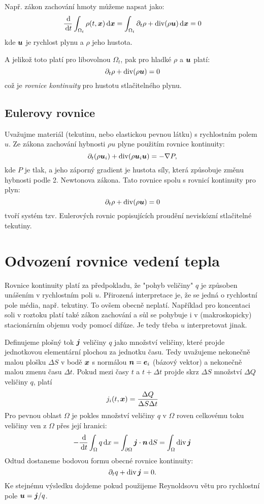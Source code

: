 Např. zákon zachování hmoty můžeme napsat jako:
\[
    \frac{\,{\rm d}}{\,{\rm d} t} \int_{\Omega_t} \rho(t,\mathbf{\boldsymbol{x}}) \,{\rm d} \mathbf{\boldsymbol{x}} = \int_{\Omega_t} \partial_t \rho + \operatorname{div} (\rho \mathbf{\boldsymbol{u}}) \,{\rm d} \mathbf{\boldsymbol{x}} = 0
\]
kde $\mathbf{\boldsymbol{u}}$ je rychlost plynu a $\rho$ jeho hustota.

A jelikož toto platí pro libovolnou $\Omega_t$, pak pro hladké $\rho$ a $\mathbf{\boldsymbol{u}}$ platí:
\[
    \partial_t \rho + \operatorname{div} (\rho \mathbf{\boldsymbol{u}}) =0
\]
což je \emph{rovnice kontinuity} pro hustotu stlačitelného plynu.

\subsection{Eulerovy rovnice}
Uvažujme materiál (tekutinu, nebo elastickou pevnou látku) s rychlostním polem  $u$. Ze zákona zachování hybnosti $\rho u$ 
plyne použitím rovnice kontinuity:
\[
    \partial_t (\rho \mathbf{\boldsymbol{u}}_i) +\operatorname{div}(\rho \mathbf{\boldsymbol{u}}_i \mathbf{\boldsymbol{u}}) = - \nabla P,
\]
kde $P$ je tlak, a jeho záporný gradient je hustota síly, která způsobuje změnu hybnosti podle 2. Newtonova zákona.
Tato rovnice spolu s rovnicí kontinuity pro plyn:
\[
    \partial_t \rho + \operatorname{div}( \rho \mathbf{\boldsymbol{u}})=0
\]
tvoří systém tzv. Eulerových rovnic popisujících proudění neviskózní stlačitelné tekutiny.


\section{Odvození rovnice vedení tepla}
Rovnice kontinuity platí za předpokladu, že "pohyb veličiny" $q$ je způsoben unášením v rychlostním poli $u$.
Přirozená interpretace je, že se jedná o rychlostní 
pole média, např. tekutiny. To ovšem obecně neplatí. Například pro koncentaci soli v roztoku platí také zákon zachování a sůl se  
pohybuje i v (makroskopicky) stacionárním objemu vody pomocí difúze. Je tedy třeba $u$ interpretovat jinak.

Definujeme plošný tok $\mathbf{\boldsymbol{j}}$ veličiny $q$ jako množství veličiny, které projde jednotkovou elementární plochou za jednotku času. Tedy  
uvažujeme nekonečně malou plošku $\Delta S$ v bodě $\mathbf{\boldsymbol{x}}$ s normálou $\mathbf{\boldsymbol{n}}=\mathbf{\boldsymbol{e}}_i$ (bázový vektor) a nekonečně malou zmenu 
času $\Delta t$.  Pokud mezi časy $t$ a $t+\Delta t$ projde skrz $\Delta S$ množství $\Delta Q$ veličiny $q$, platí
\[
    j_i(t, \mathbf{\boldsymbol{x}}) = \frac{\Delta Q}{\Delta S \Delta t} 
\]
Pro pevnou oblast $\Omega$ je pokles množství veličiny $q$ v $\Omega$ roven celkovému toku veličiny ven z $\Omega$ přes její hranici:
\[
    -\frac{\,{\rm d}}{\,{\rm d} t} \int_\Omega q \,{\rm d} x = \int_{\partial \Omega} \mathbf{\boldsymbol{j}} \cdot \mathbf{\boldsymbol{n}} \,{\rm d} S = \int_\Omega \operatorname{div} \mathbf{\boldsymbol{j}} 
\]
Odtud dostaneme bodovou formu obecné rovnice kontinuity:
\[
    \partial_t q + \operatorname{div} \mathbf{\boldsymbol{j}} = 0.
\]
Ke stejnému výsledku dojdeme pokud použijeme Reynoldsovu větu pro rychlostní pole $\mathbf{\boldsymbol{u}} = \mathbf{\boldsymbol{j}} / q$.

